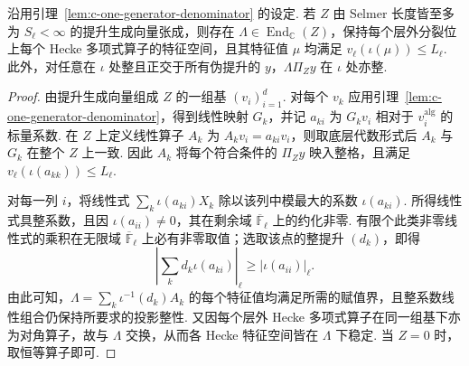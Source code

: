 \begin{lemma}[全体提升生成向量的公共分母算子]
\label{lem:c-common-denominator}
\emitthmsource
沿用引理~\ref{lem:c-one-generator-denominator} 的设定.
若 $Z$ 由 Selmer 长度皆至多为 $S_\ell<\infty$ 的提升生成向量张成，则存在 $\Lambda\in\operatorname{End}_{\mathbb C}(Z)$，保持每个层外分裂位上每个 Hecke 多项式算子的特征空间，且其特征值 $\mu$ 均满足 $v_\ell(\iota(\mu))\le L_\ell$.
此外，对任意在 $\iota$ 处整且正交于所有伪提升的 $y$，$\Lambda\Pi_Zy$ 在 $\iota$ 处亦整.
\end{lemma}
\begin{proof}
由提升生成向量组成 $Z$ 的一组基 $(v_i)_{i=1}^d$.
对每个 $v_k$ 应用引理~\ref{lem:c-one-generator-denominator}，得到线性映射 $G_k$，并记 $a_{ki}$ 为 $G_kv_i$ 相对于 $v_i^{\mathrm{alg}}$ 的标量系数.
在 $Z$ 上定义线性算子 $A_k$ 为 $A_kv_i=a_{ki}v_i$，则取底层代数形式后 $A_k$ 与 $G_k$ 在整个 $Z$ 上一致.
因此 $A_k$ 将每个符合条件的 $\Pi_Zy$ 映入整格，且满足 $v_\ell(\iota(a_{kk}))\le L_\ell$.

对每一列 $i$，将线性式 $\sum_k\iota(a_{ki})X_k$ 除以该列中模最大的系数 $\iota(a_{ki})$.
所得线性式具整系数，且因 $\iota(a_{ii})\ne0$，其在剩余域 $\overline{\mathbb F}_\ell$ 上的约化非零.
有限个此类非零线性式的乘积在无限域 $\overline{\mathbb F}_\ell$ 上必有非零取值；选取该点的整提升 $(d_k)$，即得
\[
 \left|\sum_k d_k\iota(a_{ki})\right|_\ell\ge |\iota(a_{ii})|_\ell .
\]
由此可知，$\Lambda=\sum_k\iota^{-1}(d_k)A_k$ 的每个特征值均满足所需的赋值界，且整系数线性组合仍保持所要求的投影整性.
又因每个层外 Hecke 多项式算子在同一组基下亦为对角算子，故与 $\Lambda$ 交换，从而各 Hecke 特征空间皆在 $\Lambda$ 下稳定. 当 $Z=0$ 时，取恒等算子即可.
\end{proof}


